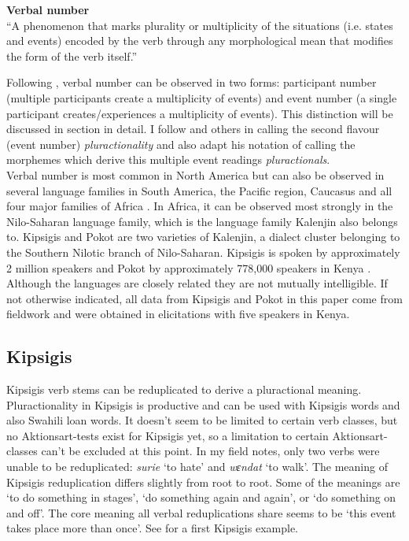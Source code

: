 \documentclass[output=paper,colorlinks,citecolor=brown
]{langscibook}
\begin{document}
\ea \label{ex:fiebig:definition} \textbf{Verbal number}\\
``A phenomenon that marks plurality or multiplicity of the situations (i.e. states and events) encoded by the verb through any morphological mean that modifies the form of the verb itself.'' \citep[4]{Mattiola2019}
\z


\noindent Following \citet{Corbett2000}, verbal number can be observed in two forms: participant number (multiple participants create a multiplicity of events) and event number (a single participant creates/experiences a multiplicity of events). This distinction will be discussed in section  in detail. I follow \cite{Henderson2012} and others in calling the second flavour (event number) \textit{pluractionality} and also adapt his notation of calling the morphemes which derive this multiple event readings \textit{pluractionals}.\\
Verbal number is most common in North America but can also be observed in several language families in South America, the Pacific region, Caucasus and all four major families of Africa \citep{wals-80}. In Africa, it can be observed most strongly in the Nilo-Saharan language family, which is the language family Kalenjin also belongs to. Kipsigis and Pokot are two varieties of Kalenjin, a dialect cluster belonging to the Southern Nilotic branch of Nilo-Saharan. 
Kipsigis is spoken by approximately 2 million speakers and Pokot by approximately 778,000 speakers in Kenya \citep{Ethnologue2023}.
Although the languages are closely related they are not mutually intelligible.
If not otherwise indicated, all data from Kipsigis and Pokot in this paper come from fieldwork and were obtained in elicitations with five speakers in Kenya.


\subsection{Kipsigis}


Kipsigis verb stems can be reduplicated to derive a pluractional meaning. Pluractionality in Kipsigis is productive and can be used with Kipsigis words and also Swahili loan words. It doesn't seem to be limited to certain verb classes, but no Aktionsart-tests exist for Kipsigis yet, so a limitation to certain Aktionsart-classes can't be excluded at this point. In my field notes, only two verbs were unable to be reduplicated: 
\textit{surie} `to hate' and \textit{wɛndat} `to walk'.
The meaning of Kipsigis reduplication differs slightly from root to root. Some of the meanings are `to do something in stages', `do something again and again', or `do something on and off'. The core meaning all verbal reduplications share seems to be `this event takes place more than once'. See  for a first Kipsigis example.
\end{document}
